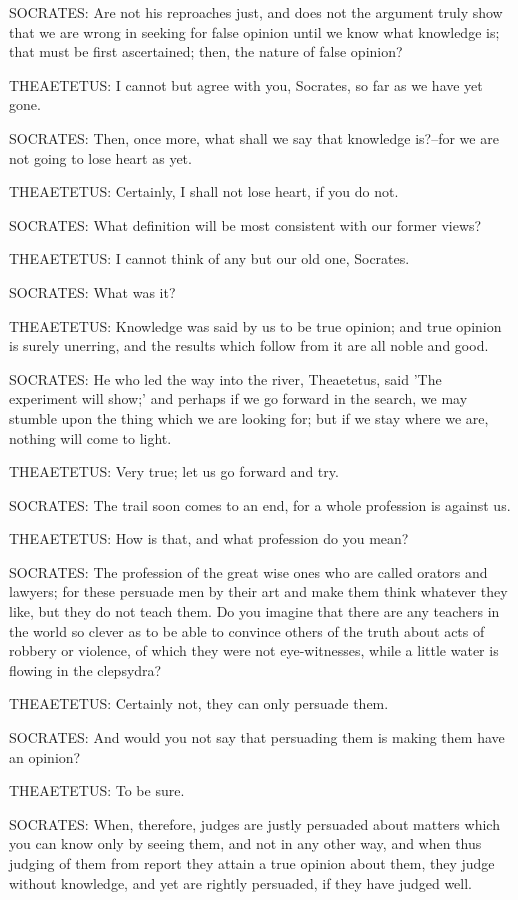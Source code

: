 SOCRATES: Are not his reproaches just, and does not the argument truly
show that we are wrong in seeking for false opinion until we know what
knowledge is; that must be first ascertained; then, the nature of false
opinion?

THEAETETUS: I cannot but agree with you, Socrates, so far as we have yet
gone.

SOCRATES: Then, once more, what shall we say that knowledge is?--for we
are not going to lose heart as yet.

THEAETETUS: Certainly, I shall not lose heart, if you do not.

SOCRATES: What definition will be most consistent with our former views?

THEAETETUS: I cannot think of any but our old one, Socrates.

SOCRATES: What was it?

THEAETETUS: Knowledge was said by us to be true opinion; and true
opinion is surely unerring, and the results which follow from it are all
noble and good.

SOCRATES: He who led the way into the river, Theaetetus, said 'The
experiment will show;' and perhaps if we go forward in the search, we
may stumble upon the thing which we are looking for; but if we stay
where we are, nothing will come to light.

THEAETETUS: Very true; let us go forward and try.

SOCRATES: The trail soon comes to an end, for a whole profession is
against us.

THEAETETUS: How is that, and what profession do you mean?

SOCRATES: The profession of the great wise ones who are called orators
and lawyers; for these persuade men by their art and make them think
whatever they like, but they do not teach them. Do you imagine that
there are any teachers in the world so clever as to be able to convince
others of the truth about acts of robbery or violence, of which
they were not eye-witnesses, while a little water is flowing in the
clepsydra?

THEAETETUS: Certainly not, they can only persuade them.

SOCRATES: And would you not say that persuading them is making them have
an opinion?

THEAETETUS: To be sure.

SOCRATES: When, therefore, judges are justly persuaded about matters
which you can know only by seeing them, and not in any other way, and
when thus judging of them from report they attain a true opinion about
them, they judge without knowledge, and yet are rightly persuaded, if
they have judged well.

